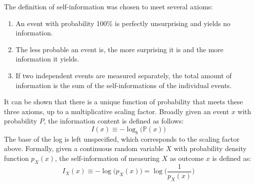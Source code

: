 \documentclass[a4paper, 12pt]{report}
\theoremstyle{remark}
\theoremstyle{definition}
\begin{document}
The definition of self-information was chosen to meet several axioms: 
\begin{enumerate}
    \item An event with probability 100\% is perfectly unsurprising and yields no information.
    \item The less probable an event is, the more surprising it is and the more information it yields.
    \item If two independent events are measured separately, the total amount of information is the sum of the self-informations of the individual events. 
\end{enumerate}
It can be shown that there is a unique function of probability that meets these three axioms, up to a multiplicative scaling factor. Broadly given an event $x$ with probability $P$, the information content is defined as follows: 
\[I(x) \equiv - \log_b \big( \mathbb{P}(x)\big)\]
The base of the log is left unspecified, which corresponds to the scaling factor above. Formally, given a continuous random variable $X$ with probability density function $p_X (x)$, the self-information of measuring $X$ as outcome $x$ is defined as:
\[I_X (x) \equiv - \log \big( p_X (x) \big) = \log \bigg(\frac{1}{p_X (x)}\bigg)\]
\end{document}
